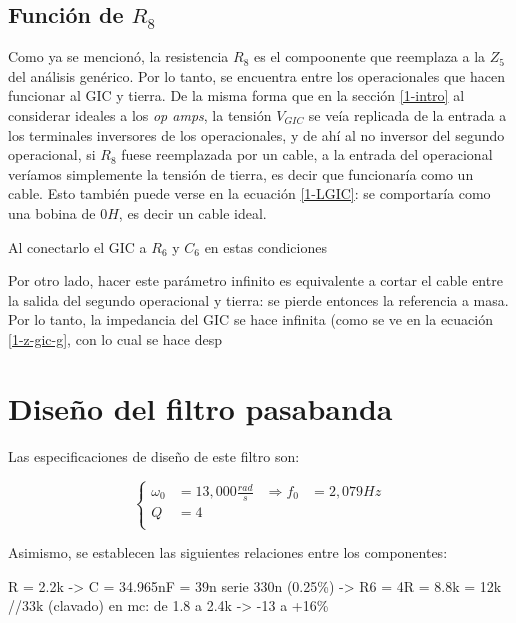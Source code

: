 \documentclass[../../tc_tp3_main.tex]{subfiles}
\begin{document}
\subsection{Funci\'on de $R_8$}

Como ya se mencion\'o, la resistencia $R_8$ es el compoonente que reemplaza a la $Z_5$ del an\'alisis gen\'erico. Por lo tanto, se encuentra entre los operacionales que hacen funcionar al GIC y tierra. De la misma forma que en la secci\'on \ref{1-intro} al considerar ideales a los \textit{op amps}, la tensi\'on $V_{GIC}$ se ve\'ia replicada de la entrada a los terminales inversores de los operacionales, y de ah\'i al no inversor del segundo operacional, si $R_8$ fuese reemplazada por un cable, a la entrada del operacional ver\'iamos simplemente la tensi\'on de tierra, es decir que funcionar\'ia como un cable. Esto tambi\'en puede verse en la ecuaci\'on \ref{1-LGIC}: se comportar\'ia como una bobina de $0H$, es decir un cable ideal.\par

Al conectarlo el GIC a $R_6$ y $C_6$ en estas condiciones

Por otro lado, hacer este  par\'ametro infinito es equivalente a cortar el cable entre la salida del segundo operacional y tierra: se pierde entonces la referencia a masa. Por lo tanto, la impedancia del GIC se hace infinita (como se ve en la ecuaci\'on \ref{1-z-gic-g}, con lo cual se hace desp




\section{Dise\~no del filtro pasabanda}

Las especificaciones de dise\~no de este filtro son:


\begin{equation}
	\left\{
 	\begin{aligned}
		\omega_0 &= 13,000\frac{rad}{s} & \Rightarrow f_0 &= 2,079Hz \\
		Q &= 4 \\ 
	\end{aligned}
	\right.
 \end{equation}

Asimismo, se establecen las siguientes relaciones entre los componentes:



R = 2.2k 	-> C = 34.965nF = 39n serie 330n (0.25\%)
		-> R6 = 4R = 8.8k = 12k //33k (clavado)
en mc: de 1.8 a 2.4k -> -13  a +16\%
\end{document}
